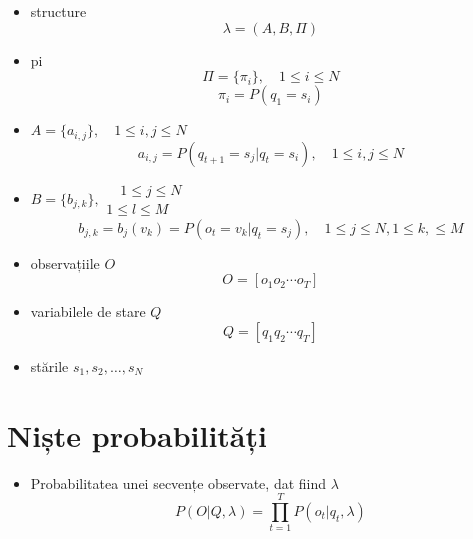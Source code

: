 \documentclass[10pt]{article}
\begin{document}
\begin{itemize}
\item structure
  \begin{equation}
    \label{eq:lambda}
    \lambda = (A, B, \Pi)
  \end{equation}
\item pi
  \begin{equation}
    \label{eq:pi}
    \Pi = \lbrace \pi_i \rbrace,\quad 1 \le i \le N
  \end{equation}
  \begin{equation}
    \label{eq:pii}
    \pi_i = P(q_1 = s_i)
  \end{equation}
\item $A = \lbrace a_{i,j} \rbrace, \quad 1 \le i, j \le N$
  \begin{equation}
    \label{eq:transition}
    a_{i,j}=P(q_{t+1}=s_j \vert q_t = s_i),\quad 1 \le i, j \le N
  \end{equation}
\item $B = \lbrace b_{j,k} \rbrace, \substack{\quad 1 \le j \le N \\ 1
    \le l \le M}$
  \begin{equation}
    \label{eq:transition}
    b_{j,k}=b_{j}(v_k)=P(o_t = v_k \vert q_t = s_j),\quad 1 \le j \le N, 1 \le k, \le M
  \end{equation}
\item observațiile $O$
  \begin{equation}
    \label{eq:obs}
    O = [ o_1 o_2 \cdots o_T ]
  \end{equation}
\item variabilele de stare $Q$
  \begin{equation}
    \label{eq:states}
    Q = [ q_1 q_2 \cdots q_T ]
  \end{equation}
\item stările $s_1, s_2, \ldots, s_N$

\end{itemize}

\section{Niște probabilități}
\label{sec:probs}

\begin{itemize}
\item Probabilitatea unei secvențe observate, dat fiind $\lambda$
  \begin{equation}
    \label{eq:probobs}
    P(O \vert Q, \lambda)= \displaystyle\prod_{t=1}^{T}P(o_t \vert q_t, \lambda)
  \end{equation}

\end{itemize}
\end{document}
